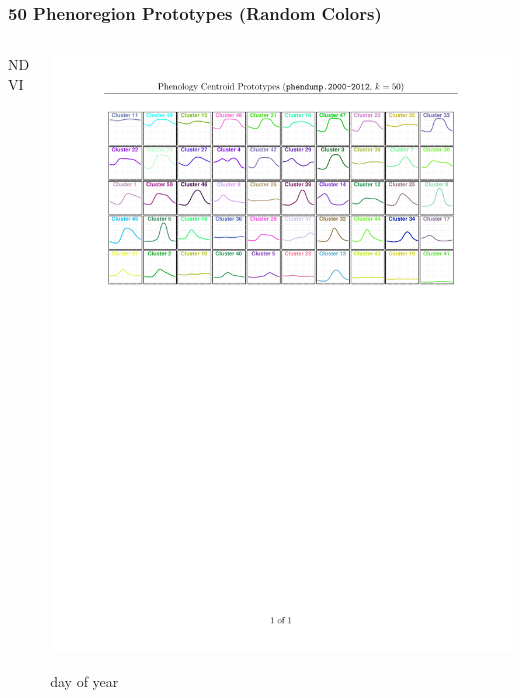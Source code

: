 \begin{frame}
 \frametitle{50 Phenoregion Prototypes (Random Colors)}
 \begin{center}
  \begin{columns}
   \begin{column}{0.01\textwidth}
    \begin{sideways}\vbox{\Large NDVI}\end{sideways}
   \end{column}
   \hspace{-0.3in}
   \begin{column}{0.95\textwidth}
    \includegraphics[width=\textwidth,trim=1in 6.5in 1in 1in,clip=true]{figures/paintchips.phendump.2000-2012.50.pdf} \\
    \vskip-0.15in
    \centerline{\Large day of year}
   \end{column}
  \end{columns}
 \end{center}
\end{frame}

